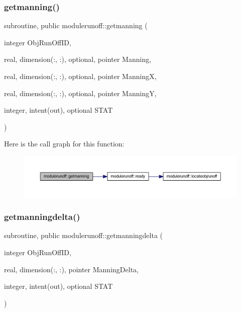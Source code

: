 \subsubsection{\texorpdfstring{getmanning()}{getmanning()}}
{\footnotesize\ttfamily subroutine, public modulerunoff\+::getmanning (\begin{DoxyParamCaption}\item[{integer}]{Obj\+Run\+Off\+ID,  }\item[{real, dimension(\+:, \+:), optional, pointer}]{Manning,  }\item[{real, dimension(\+:, \+:), optional, pointer}]{ManningX,  }\item[{real, dimension(\+:, \+:), optional, pointer}]{ManningY,  }\item[{integer, intent(out), optional}]{S\+T\+AT }\end{DoxyParamCaption})}

Here is the call graph for this function\+:
\nopagebreak
\begin{figure}[H]
\begin{center}
\leavevmode
\includegraphics[width=350pt]{namespacemodulerunoff_a2cad42fe7c6c24a46f9a75f3528e8abb_cgraph}
\end{center}
\end{figure}
\mbox{\label{namespacemodulerunoff_a9ca63f5612ab734b77497c2eca2c05bd}} 
\subsubsection{\texorpdfstring{getmanningdelta()}{getmanningdelta()}}
{\footnotesize\ttfamily subroutine, public modulerunoff\+::getmanningdelta (\begin{DoxyParamCaption}\item[{integer}]{Obj\+Run\+Off\+ID,  }\item[{real, dimension(\+:, \+:), pointer}]{Manning\+Delta,  }\item[{integer, intent(out), optional}]{S\+T\+AT }\end{DoxyParamCaption})}

